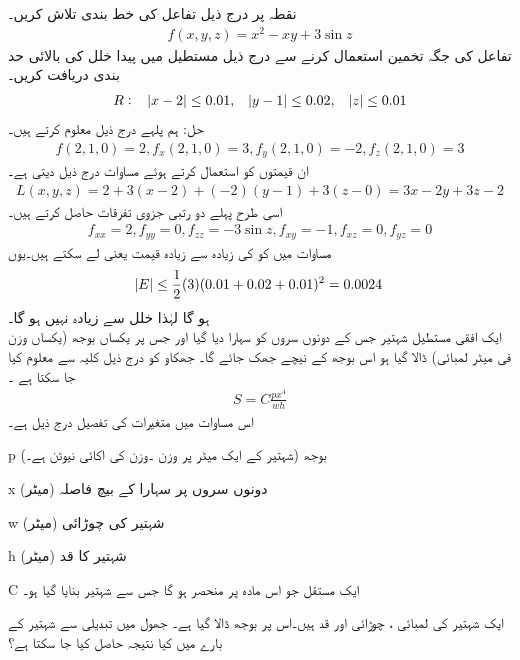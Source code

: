 نقطہ  پر درج ذیل تفاعل کی خط بندی  تلاش کریں۔
\begin{align*}
f(x,y,z)=x^2-xy+3\sin z
\end{align*}
تفاعل  کی جگہ تخمین  استعمال کرنے سے درج ذیل مستطیل میں   پیدا خلل کی بالائی حد بندی دریافت کریں۔
\begin{align*}
R:\quad \abs{x-2}\le 0.01,\quad \abs{y-1}\le 0.02,\quad \abs{z}\le 0.01
\end{align*}
حل:\quad
ہم پلہے درج ذیل معلوم کرتے ہیں۔
\begin{align*}
f(2,1,0)=2, f_x(2,1,0)=3, f_y(2,1,0)=-2,f_z(2,1,0)=3
\end{align*}
ان قیمتوں کو استعمال کرتے ہوئے  مساوات  درج ذیل دیتی ہے۔
\begin{align*}
L(x,y,z)=2+3(x-2)+(-2)(y-1)+3(z-0)=3x-2y+3z-2
\end{align*}
اسی طرح پہلے دو رتبی جزوی تفرقات حاصل کرتے ہیں۔
\begin{align*}
f_{xx}=2, f_{yy}=0, f_{zz}=-3\sin z, f_{xy}=-1,f_{xz}=0,f_{yz}=0
\end{align*}
مساوات  میں  کو  کی زیادہ سے زیادہ قیمت یعنی  لے سکتے ہیں۔یوں 
\begin{align*}
\abs{E}\le \frac{1}{2}(3)(0.01+0.02+0.01)^2=0.0024
\end{align*}
ہو گا لہٰذا خلل  سے زیادہ نہیں ہو گا۔
\\
ایک افقی مستطیل شہتیر جس کے  دونوں سروں کو  سہارا دیا گیا  اور جس پر یکساں بوجھ (یکساں وزن فی میٹر لمبائی) ڈالا گیا ہو  اس  بوجھ کے نیچے جھک جائے گا۔ جھکاو   کو درج ذیل کلیہ سے معلوم کیا جا سکتا ہے ۔
\begin{align*}
S=C\frac{px^4}{wh}
\end{align*}
اس مساوات میں متغیرات کی تفصیل درج ذیل ہے۔
\begin{description}
\item{p}\quad
بوجھ (شہتیر کے ایک میٹر پر وزن ۔وزن کی اکائی نیوٹن ہے۔)
\item{x}\quad
دونوں سروں پر سہارا کے بیچ فاصلہ (میٹر)
\item{w}\quad
شہتیر کی چوڑائی (میٹر)
\item{h}\quad
شہتیر کا قد (میٹر)
\item{C}\quad
ایک مستقل  جو اس مادہ پر منحصر ہو گا جس سے شہتیر بنایا گیا ہو۔
\end{description}
ایک شہتیر کی   لمبائی ، چوڑائی    اور   قد    ہیں۔اس پر  بوجھ ڈالا گیا ہے۔ جھول میں تبدیلی    سے شہتیر کے بارے میں کیا نتیجہ حاصل کیا جا سکتا ہے؟

